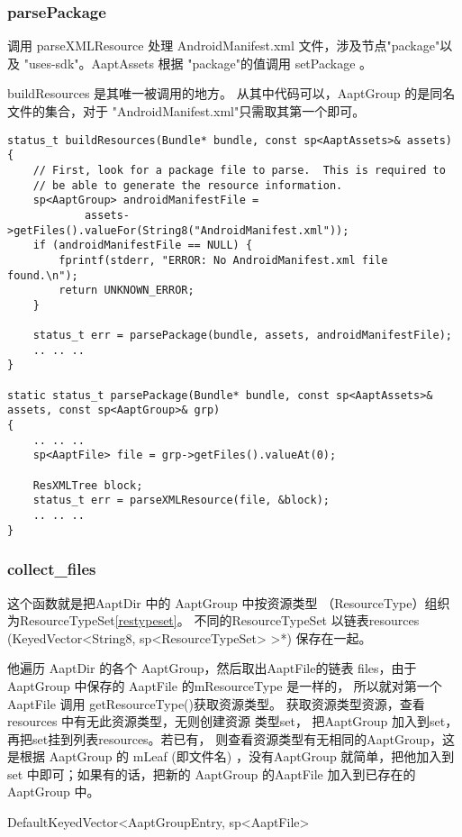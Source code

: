 \documentclass[a4paper,11pt]{article}
\begin{document}
\subsubsection{parsePackage}
调用 parseXMLResource 处理 AndroidManifest.xml 文件，涉及节点"package"以及
"uses-sdk"。AaptAssets 根据 "package"的值调用 setPackage 。

buildResources 是其唯一被调用的地方。
从其中代码可以，AaptGroup 的是同名文件的集合，对于 "AndroidManifest.xml"只需取其第一个即可。
\begin{lstlisting}
status_t buildResources(Bundle* bundle, const sp<AaptAssets>& assets)
{
    // First, look for a package file to parse.  This is required to
    // be able to generate the resource information.
    sp<AaptGroup> androidManifestFile =
            assets->getFiles().valueFor(String8("AndroidManifest.xml"));
    if (androidManifestFile == NULL) {
        fprintf(stderr, "ERROR: No AndroidManifest.xml file found.\n");
        return UNKNOWN_ERROR;
    }

    status_t err = parsePackage(bundle, assets, androidManifestFile);
    .. .. ..
}

static status_t parsePackage(Bundle* bundle, const sp<AaptAssets>& assets, const sp<AaptGroup>& grp)
{
    .. .. ..
    sp<AaptFile> file = grp->getFiles().valueAt(0);

    ResXMLTree block;
    status_t err = parseXMLResource(file, &block);
    .. .. ..
}
\end{lstlisting}
\subsubsection{collect_files}
这个函数就是把AaptDir 中的 AaptGroup 中按资源类型
（ResourceType）组织为ResourceTypeSet\cref{restypeset}。
不同的ResourceTypeSet 以链表resources
(KeyedVector<String8, sp<ResourceTypeSet> >*)
保存在一起。

他遍历 AaptDir 的各个 AaptGroup，然后取出AaptFile的链表
files，由于 AaptGroup 中保存的 AaptFile 的mResourceType 是一样的，
所以就对第一个AaptFile 调用 getResourceType()获取资源类型。
获取资源类型资源，查看 resources 中有无此资源类型，无则创建资源
类型set， 把AaptGroup 加入到set，再把set挂到列表resources。若已有，
则查看资源类型有无相同的AaptGroup，这是根据 AaptGroup 的 mLeaf (即文件名)
，没有AaptGroup 就简单，把他加入到 set 中即可；如果有的话，把新的 AaptGroup
的AaptFile 加入到已存在的 AaptGroup 中。

DefaultKeyedVector<AaptGroupEntry, sp<AaptFile>
\end{document}
